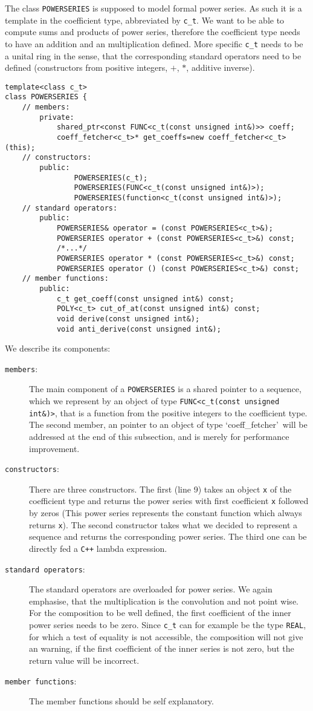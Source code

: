 \documentclass{article}
\newcommand{\cc}{\texttt{C++}\xspace}
\newcommand{\ir}[1]{\texttt{#1}}
\newcommand{\code}[1]{\texttt{#1}}
\newcommand{\func}[1]{\texttt{#1}}
\begin{document}
The class \func{POWERSERIES} is supposed to model formal power series. As such it is a template in the coefficient type, abbreviated by \code{c\_t}. We want to be able to compute sums and products of power series, therefore the coefficient type needs to have an addition and an multiplication defined. More specific \code{c\_t} needs to be a unital ring in the sense, that the corresponding standard operators need to be defined (constructors from positive integers, $+$, $*$, additive inverse). 
\begin{lstlisting}
template<class c_t>
class POWERSERIES {
	// members:
		private:
			shared_ptr<const FUNC<c_t(const unsigned int&)>> coeff;
			coeff_fetcher<c_t>* get_coeffs=new coeff_fetcher<c_t>(this);
	// constructors:
		public:
				POWERSERIES(c_t);
				POWERSERIES(FUNC<c_t(const unsigned int&)>);
				POWERSERIES(function<c_t(const unsigned int&)>);
	// standard operators:
		public:
			POWERSERIES& operator = (const POWERSERIES<c_t>&);
			POWERSERIES operator + (const POWERSERIES<c_t>&) const;
			/*...*/
			POWERSERIES operator * (const POWERSERIES<c_t>&) const;
			POWERSERIES operator () (const POWERSERIES<c_t>&) const; 
	// member functions:
		public:
			c_t get_coeff(const unsigned int&) const;
			POLY<c_t> cut_of_at(const unsigned int&) const;
			void derive(const unsigned int&);
			void anti_derive(const unsigned int&);	
\end{lstlisting}
We describe its components:
\begin{description}
\item[\code{members}:] The main component of a \func{POWERSERIES} is a shared pointer to a sequence, which we represent by an object of type \func{FUNC<c\_t(const unsigned int\&)>}, that is a function from the positive integers to the coefficient type. The second member, an pointer to an object of type \lq coeff\_fetcher\rq\ will be addressed at the end of this subsection, and is merely for performance improvement.
\item[\code{constructors}:] There are three constructors. The first (line 9) takes an object \code{x} of the coefficient type and returns the power series with first coefficient \code{x} followed by zeros (This power series represents the constant function which always returns \code{x}). The second constructor takes what we decided to represent a sequence and returns the corresponding power series. The third one can be directly fed a \cc lambda expression.
\item[\code{standard operators}:] The standard operators are overloaded for power series. We again emphasise, that the multiplication is the convolution and not point wise. For the composition to be well defined, the first coefficient of the inner power series needs to be zero. Since \code{c\_t} can for example be the type \ir{REAL}, for which a test of equality is not accessible, the composition will not give an warning, if the first coefficient of the inner series is not zero, but the return value will be incorrect.
\item[\code{member functions}:] The member functions should be self explanatory.
\end{description}
\end{document}
